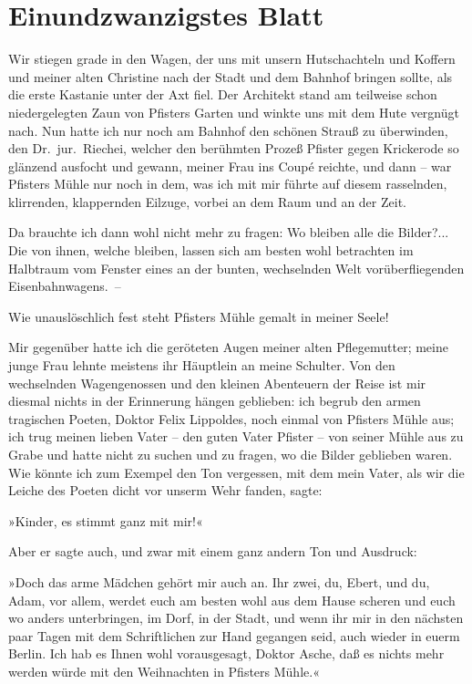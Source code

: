 \section{Einundzwanzigstes Blatt}

Wir stiegen grade in den Wagen, der uns mit unsern Hutschachteln
und Koffern und meiner alten Christine nach der Stadt und dem
Bahnhof bringen sollte, als die erste Kastanie unter der Axt fiel.
Der Architekt stand am teilweise schon niedergelegten Zaun von
Pfisters Garten und winkte uns mit dem Hute vergnügt nach. Nun
hatte ich nur noch am Bahnhof den schönen Strauß zu überwinden, den
Dr.~jur.~Riechei, welcher den berühmten Prozeß Pfister gegen
Krickerode so glänzend ausfocht und gewann, meiner Frau ins Coupé
reichte, und dann – war Pfisters Mühle nur noch in dem, was ich mit
mir führte auf diesem rasselnden, klirrenden, klappernden Eilzuge,
vorbei an dem Raum und an der Zeit.

Da brauchte ich dann wohl nicht mehr zu fragen: Wo bleiben alle die
Bilder?... Die von ihnen, welche bleiben, lassen sich am besten
wohl betrachten im Halbtraum vom Fenster eines an der bunten,
wechselnden Welt vorüberfliegenden Eisenbahnwagens.~–

Wie unauslöschlich fest steht Pfisters Mühle gemalt in meiner
Seele!

Mir gegenüber hatte ich die geröteten Augen meiner alten
Pflegemutter; meine junge Frau lehnte meistens ihr Häuptlein an
meine Schulter. Von den wechselnden Wagengenossen und den kleinen
Abenteuern der Reise ist mir diesmal nichts in der Erinnerung
hängen geblieben: ich begrub den armen tragischen Poeten, Doktor
Felix Lippoldes, noch einmal von Pfisters Mühle aus; ich trug
meinen lieben Vater – den guten Vater Pfister – von seiner Mühle
aus zu Grabe und hatte nicht zu suchen und zu fragen, wo die Bilder
geblieben waren. Wie könnte ich zum Exempel den Ton vergessen, mit
dem mein Vater, als wir die Leiche des Poeten dicht vor unserm Wehr
fanden, sagte:

»Kinder, es stimmt ganz mit mir!«

Aber er sagte auch, und zwar mit einem ganz andern Ton und
Ausdruck:

»Doch das arme Mädchen gehört mir auch an. Ihr zwei, du, Ebert, und
du, Adam, vor allem, werdet euch am besten wohl aus dem Hause
scheren und euch wo anders unterbringen, im Dorf, in der Stadt, und
wenn ihr mir in den nächsten paar Tagen mit dem Schriftlichen zur
Hand gegangen seid, auch wieder in euerm Berlin. Ich hab es Ihnen
wohl vorausgesagt, Doktor Asche, daß es nichts mehr werden würde
mit den Weihnachten in Pfisters Mühle.«

